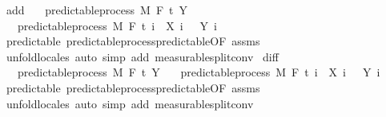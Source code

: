 \begin{isabellebody}
\endisatagproof
{\isafoldproof}%
%
\isadelimproof
\isanewline
%
\endisadelimproof
\isanewline
{}\isamarkupfalse%
\ add{\isacharcolon}{\kern0pt}\isanewline
\ \ \ {\isachardoublequoteopen}predictable{\isacharunderscore}{\kern0pt}process\ M\ F\ t\ Y{\isachardoublequoteclose}\isanewline
\ \ \ {\isachardoublequoteopen}predictable{\isacharunderscore}{\kern0pt}process\ M\ F\ t\ {\isacharparenleft}{\kern0pt}{\isasymlambda}i\ {\isasymxi}{\isachardot}{\kern0pt}\ X\ i\ {\isasymxi}\ {\isacharplus}{\kern0pt}\ Y\ i\ {\isasymxi}{\isacharparenright}{\kern0pt}{\isachardoublequoteclose}\isanewline
%
\isadelimproof
\ \ %
\endisadelimproof
%
\isatagproof
{}\isamarkupfalse%
\ predictable\ predictable{\isacharunderscore}{\kern0pt}process{\isachardot}{\kern0pt}predictable{\isacharbrackleft}{\kern0pt}OF\ assms{\isacharbrackright}{\kern0pt}\ \isamarkupfalse%
\ {\isacharparenleft}{\kern0pt}unfold{\isacharunderscore}{\kern0pt}locales{\isacharparenright}{\kern0pt}\ {\isacharparenleft}{\kern0pt}auto\ simp\ add{\isacharcolon}{\kern0pt}\ measurable{\isacharunderscore}{\kern0pt}split{\isacharunderscore}{\kern0pt}conv{\isacharparenright}{\kern0pt}%
\endisatagproof
{\isafoldproof}%
%
\isadelimproof
\isanewline
%
\endisadelimproof
\isanewline
{}\isamarkupfalse%
\ diff{\isacharcolon}{\kern0pt}\isanewline
\ \ \ {\isachardoublequoteopen}predictable{\isacharunderscore}{\kern0pt}process\ M\ F\ t\ Y{\isachardoublequoteclose}\isanewline
\ \ \ {\isachardoublequoteopen}predictable{\isacharunderscore}{\kern0pt}process\ M\ F\ t\ {\isacharparenleft}{\kern0pt}{\isasymlambda}i\ {\isasymxi}{\isachardot}{\kern0pt}\ X\ i\ {\isasymxi}\ {\isacharminus}{\kern0pt}\ Y\ i\ {\isasymxi}{\isacharparenright}{\kern0pt}{\isachardoublequoteclose}\isanewline
%
\isadelimproof
\ \ %
\endisadelimproof
%
\isatagproof
{}\isamarkupfalse%
\ predictable\ predictable{\isacharunderscore}{\kern0pt}process{\isachardot}{\kern0pt}predictable{\isacharbrackleft}{\kern0pt}OF\ assms{\isacharbrackright}{\kern0pt}\ \isamarkupfalse%
\ {\isacharparenleft}{\kern0pt}unfold{\isacharunderscore}{\kern0pt}locales{\isacharparenright}{\kern0pt}\ {\isacharparenleft}{\kern0pt}auto\ simp\ add{\isacharcolon}{\kern0pt}\ measurable{\isacharunderscore}{\kern0pt}split{\isacharunderscore}{\kern0pt}conv{\isacharparenright}{\kern0pt}%
\endisatagproof
{\isafoldproof}%
%
\isadelimproof
\isanewline

\end{isabellebody}
